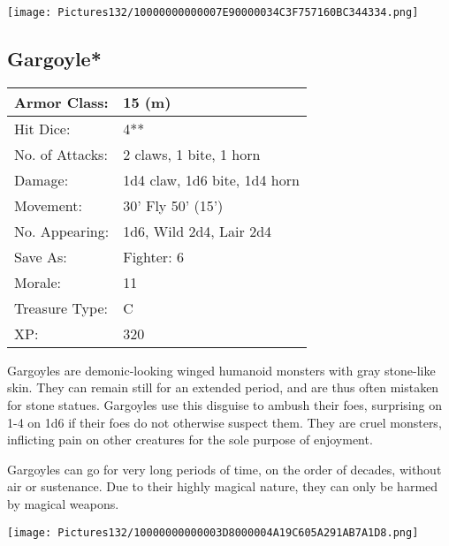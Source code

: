 \documentclass[a4paper,twoside,openany,10pt]{book}
\begin{document}
\begin{center}
	\texttt{[image: Pictures132/10000000000007E90000034C3F757160BC344334.png]}
\end{center}

\begin{multicols}{2}
	

\subsection*{Gargoyle*}\label{gargoyle}

\begin{tabularx}{0.48\textwidth}{@{}lX@{}}
Armor Class: & 15 (m) \\\hline
Hit Dice: & 4** \\\hline
No. of Attacks: & 2 claws, 1 bite, 1 horn \\\hline
Damage: & 1d4 claw, 1d6 bite, 1d4 horn \\\hline
Movement: & 30' Fly 50'
(15') \\\hline
No. Appearing: & 1d6, Wild 2d4, Lair 2d4 \\\hline
Save As: & Fighter: 6 \\\hline
Morale: & 11 \\\hline
Treasure Type: & C \\\hline
XP: & 320 \\\hline
\end{tabularx}\medskip



Gargoyles are demonic-looking winged humanoid monsters with gray stone-like skin. They can remain still for an extended period, and are thus often mistaken for stone statues. Gargoyles use this disguise to ambush their foes, surprising on 1-4 on 1d6 if their foes do not otherwise suspect them. They are cruel monsters, inflicting pain on other creatures for the sole purpose of enjoyment.

Gargoyles can go for very long periods of time, on the order of decades, without air or sustenance. Due to their highly magical nature, they can only be harmed by magical weapons.

\end{multicols}

\vfill

\begin{center}
	\texttt{[image: Pictures132/10000000000003D8000004A19C605A291AB7A1D8.png]}
\end{center}
\end{document}
